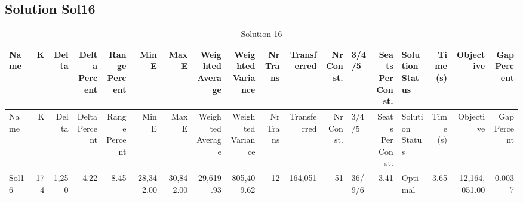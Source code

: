 \documentclass[a4paper]{article}
\begin{document}
\clearpage
\subsection{Solution Sol16}

{\scriptsize
\begin{longtable}{lrrrrrrrrrrrlrlrrr}
\caption{Solution 16}
\\ \toprule
Name &K &Delta &\shortstack{Delta\\Percent} &\shortstack{Range\\Percent} &Min E &Max E &\shortstack{Weighted\\Average} &\shortstack{Weighted\\Variance} &\shortstack{Nr\\Trans} &Transferred &\shortstack{Nr\\Const.} &3/4/5 &\shortstack{Seats\\Per\\Const.} &\shortstack{Solution\\Status} &\shortstack{Time\\(s)} &Objective &\shortstack{Gap\\Percent} \\ \midrule
\endfirsthead
\toprule
Name &K &Delta &\shortstack{Delta\\Percent} &\shortstack{Range\\Percent} &Min E &Max E &\shortstack{Weighted\\Average} &\shortstack{Weighted\\Variance} &\shortstack{Nr\\Trans} &Transferred &\shortstack{Nr\\Const.} &3/4/5 &\shortstack{Seats\\Per\\Const.} &\shortstack{Solution\\Status} &\shortstack{Time\\(s)} &Objective &\shortstack{Gap\\Percent} \\ \midrule
\endhead
\bottomrule
\endfoot
Sol16&174&1,250& 4.22& 8.45&28,342.00&30,842.00&29,619.93&805,409.62&12&164,051&51&36/9/6& 3.41&Optimal& 3.65&12,164,051.00&0.0037\\ 
\end{longtable}

}
\end{document}
